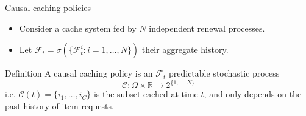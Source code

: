 \documentclass[aspectratio=169]{beamer}
\newenvironment*{myitem}[1][1.5em]{\begin{itemize}\setlength{\itemsep}{#1}}{\end{itemize}}
\begin{document}
\begin{frame}{Causal caching policies}
	
	\begin{myitem}[1em]
		\item Consider a cache system fed by $N$ independent renewal processes.
		\item Let $\mathcal{F}_t = \sigma(\{\mathcal{F}_t^i: i=1,\ldots,N\})$ their aggregate history.
	\end{myitem}

	\vfill

	\begin{block}{Definition}
		A \alert{causal} caching policy is an $\mathcal{F}_t$ \alert{predictable} stochastic process
		\begin{equation*}
			\mathcal{C}:\Omega\times\mathbb{R} \to 2^{\{1,\ldots,N\}} 
		\end{equation*}
		i.e. $\mathcal{C}(t) = \{i_1,\ldots,i_C\}$ is the subset cached at time $t$, and only depends on the past history of item requests.
	\end{block}

\end{frame}
\end{document}

